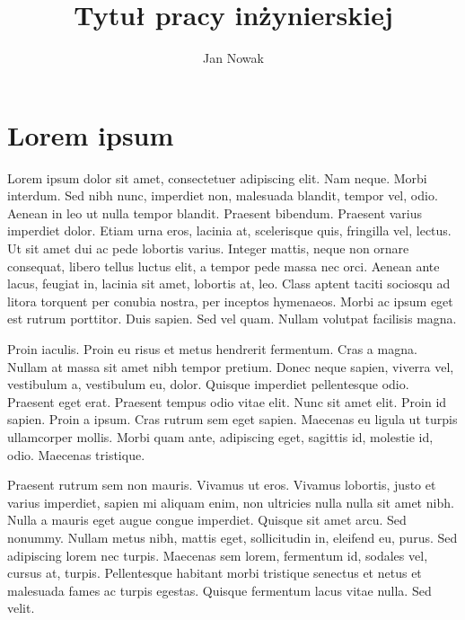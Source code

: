 \documentclass[eng,printmode]{mgr}
\title{Tytuł pracy inżynierskiej}
\author{Jan Nowak}
\begin{document}

\maketitle %

\tableofcontents %

\chapter{Lorem ipsum}
Lorem ipsum dolor sit amet, consectetuer adipiscing elit. Nam neque. Morbi interdum. Sed nibh nunc, imperdiet non, malesuada blandit, tempor vel, odio. Aenean in leo ut nulla tempor blandit. Praesent bibendum. Praesent varius imperdiet dolor. Etiam urna eros, lacinia at, scelerisque quis, fringilla vel, lectus. Ut sit amet dui ac pede lobortis varius. Integer mattis, neque non ornare consequat, libero tellus luctus elit, a tempor pede massa nec orci. Aenean ante lacus, feugiat in, lacinia sit amet, lobortis at, leo. Class aptent taciti sociosqu ad litora torquent per conubia nostra, per inceptos hymenaeos. Morbi ac ipsum eget est rutrum porttitor. Duis sapien. Sed vel quam. Nullam volutpat facilisis magna. 

Proin iaculis. Proin eu risus et metus hendrerit fermentum. Cras a magna. Nullam at massa sit amet nibh tempor pretium. Donec neque sapien, viverra vel, vestibulum a, vestibulum eu, dolor. Quisque imperdiet pellentesque odio. Praesent eget erat. Praesent tempus odio vitae elit. Nunc sit amet elit. Proin id sapien. Proin a ipsum. Cras rutrum sem eget sapien. Maecenas eu ligula ut turpis ullamcorper mollis. Morbi quam ante, adipiscing eget, sagittis id, molestie id, odio. Maecenas tristique. 

Praesent rutrum sem non mauris. Vivamus ut eros. Vivamus lobortis, justo et varius imperdiet, sapien mi aliquam enim, non ultricies nulla nulla sit amet nibh. Nulla a mauris eget augue congue imperdiet. Quisque sit amet arcu. Sed nonummy. Nullam metus nibh, mattis eget, sollicitudin in, eleifend eu, purus. Sed adipiscing lorem nec turpis. Maecenas sem lorem, fermentum id, sodales vel, cursus at, turpis. Pellentesque habitant morbi tristique senectus et netus et malesuada fames ac turpis egestas. Quisque fermentum lacus vitae nulla. Sed velit. 
\end{document}
